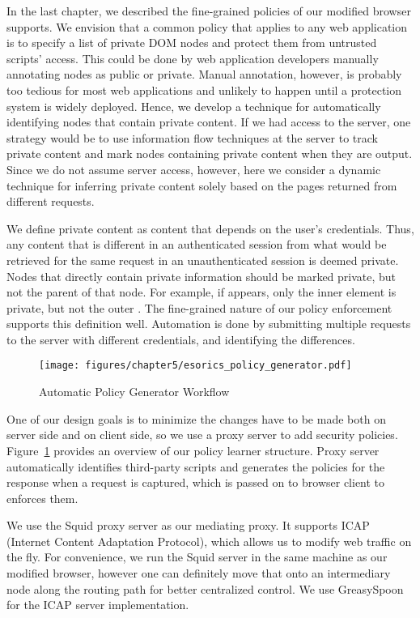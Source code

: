 In the last chapter, we described the fine-grained policies of our modified browser supports.  We envision that a common policy that applies to any web application is to specify a list of private DOM nodes and protect them from untrusted scripts' access.  This could be done by web application developers manually annotating nodes as public or private.  Manual annotation, however, is probably too tedious for most web applications and unlikely to happen until a protection system is widely deployed.  Hence, we develop a technique for automatically identifying nodes that contain private content.  If we had access to the server, one strategy would be to use information flow techniques at the server to track private content and mark nodes containing private content when they are output.  Since we do not assume server access, however, here we consider a dynamic technique for inferring private content solely based on the pages returned from different requests.  

We define private content as content that depends on the user's credentials.  Thus, any content that is different in an authenticated session from what would be retrieved for the same request in an unauthenticated session is deemed private.  Nodes that directly contain private information should be marked private, but not the parent of that node.  For example, if  appears, only the inner  element is private, but not the outer .  The fine-grained nature of our policy enforcement supports this definition well.  Automation is done by submitting multiple requests to the server with different credentials, and identifying the differences.

\begin{figure}[hbt]
\centering
\texttt{[image: figures/chapter5/esorics\_policy\_generator.pdf]}
\caption{Automatic Policy Generator Workflow}
\label{fig:esorics_policy_generator}
\end{figure}

One of our design goals is to minimize the changes have to be made both on server side and on client side, so we use a proxy server to add security policies.  Figure~\ref{fig:esorics_policy_generator} provides an overview of our policy learner structure.  Proxy server automatically identifies third-party scripts and generates the policies for the response when a request is captured, which is passed on to browser client to enforces them.

We use the Squid proxy server as our mediating proxy.  It supports ICAP (Internet Content Adaptation Protocol), which allows us to modify web traffic on the fly.  For convenience, we run the Squid server in the same machine as our modified browser, however one can definitely move that onto an intermediary node along the routing path for better centralized control.  We use GreasySpoon~\cite{GreasySpoon} for the ICAP server implementation.

